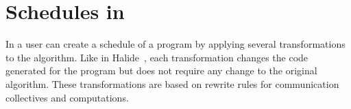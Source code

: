 \iffalse
\section{Schedules in \tool}
\label{sec:schedule}
In \tool{} a user can create a schedule of a program by applying several transformations to the algorithm. 
Like in Halide~\cite{halide}, each transformation changes the code generated for the program but does not require any change to the original algorithm.
These transformations are based on rewrite rules for communication collectives and computations.

